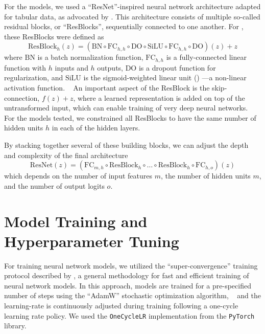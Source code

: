 For the  models, 
we used a \enquote{ResNet}-inspired neural network architecture
adapted for tabular data, as advocated by \textcite{gorishniyRevisiting2023}.
This architecture consists of multiple so-called residual blocks,
or \enquote{ResBlocks}, sequentially connected to one another.
For , these ResBlocks were defined as
%
\begin{equation}
    \mathrm{ResBlock}_{h}(z) = ( 
    \mathrm{BN} 
    \circ \mathrm{FC}_{h,h} 
    \circ \mathrm{DO} 
    \circ \mathrm{SiLU} 
    \circ \mathrm{FC}_{h,h} 
    \circ \mathrm{DO} 
    )(z)  + z
\label{eq:resblock}%
\end{equation}%
where \(\mathrm{BN}\) is a batch normalization function,
\(\mathrm{FC}_{h,h}\) is a fully-connected linear function
with \(h\) inputs and \(h\) outputs, 
\(\mathrm{DO}\) is a dropout function for regularization,
and \(\mathrm{SiLU}\) is the sigmoid-weighted linear unit ()%
---a non-linear activation function.
~\autocite{elfwingSigmoidWeighted2017}
An important aspect of the ResBlock is the skip-connection,
\(f(z) + z\), where a learned representation is added on top of 
the untransformed input, which can enable training of
very deep neural networks.
~\autocite{orhanSkip2018}
For the models tested, we constrained all ResBlocks to have the same
number of hidden units \(h\) in each of the hidden layers.

By stacking together several of these building blocks,
we can adjust the depth and complexity of the final architecture
\begin{equation}
    \mathrm{ResNet}(z) = 
    (
    \mathrm{FC}_{m,h} 
    \circ 
    \mathrm{ResBlock}_{h} 
    \circ \dots 
    \circ \mathrm{ResBlock}_{h} 
    \circ \mathrm{FC}_{h,o} 
    )(z)
\end{equation}
which depends on the number of input features \(m\),
the number of hidden units \(m\), 
and the number of output logits \(o\).%

\section{Model Training and Hyperparameter Tuning}

For training neural network models, 
we utilized the \enquote{super-convergence} training protocol
described by \textcite{smithSuperConvergence2018a},
a general methodology for fast and efficient training of
neural network models.
In this approach, 
models are trained for a pre-specified number of steps
using the \enquote{AdamW} stochastic optimization algorithm,
~\autocite{loshchilovDecoupled2019}
and the learning-rate is continuously adjusted during training
following a one-cycle learning rate policy.
We used the \texttt{OneCycleLR} implementation 
from the \texttt{PyTorch} library.%

